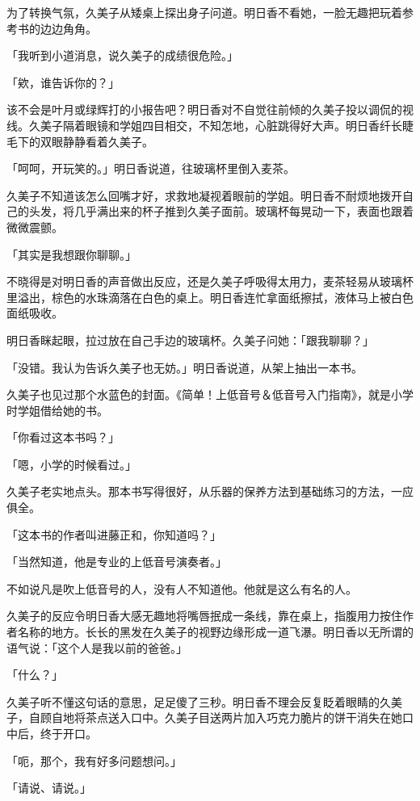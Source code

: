 \documentclass[UTF8]{ctexart}
\begin{document}
    为了转换气氛，久美子从矮桌上探出身子问道。明日香不看她，一脸无趣把玩着参考书的边边角角。 

    「我听到小道消息，说久美子的成绩很危险。」 

    「欸，谁告诉你的？」 

    该不会是叶月或绿辉打的小报告吧？明日香对不自觉往前倾的久美子投以调侃的视线。久美子隔着眼镜和学姐四目相交，不知怎地，心脏跳得好大声。明日香纤长睫毛下的双眼静静看着久美子。 

    「呵呵，开玩笑的。」明日香说道，往玻璃杯里倒入麦茶。 

    久美子不知道该怎么回嘴才好，求救地凝视着眼前的学姐。明日香不耐烦地拨开自己的头发，将几乎满出来的杯子推到久美子面前。玻璃杯每晃动一下，表面也跟着微微震颤。 

    「其实是我想跟你聊聊。」 

    不晓得是对明日香的声音做出反应，还是久美子呼吸得太用力，麦茶轻易从玻璃杯里溢出，棕色的水珠滴落在白色的桌上。明日香连忙拿面纸擦拭，液体马上被白色面纸吸收。 

    明日香眯起眼，拉过放在自己手边的玻璃杯。久美子问她：「跟我聊聊？」 

    「没错。我认为告诉久美子也无妨。」明日香说道，从架上抽出一本书。 

    久美子也见过那个水蓝色的封面。《简单！上低音号＆低音号入门指南》，就是小学时学姐借给她的书。 

    「你看过这本书吗？」 

    「嗯，小学的时候看过。」 

    久美子老实地点头。那本书写得很好，从乐器的保养方法到基础练习的方法，一应俱全。 

    「这本书的作者叫进藤正和，你知道吗？」 

    「当然知道，他是专业的上低音号演奏者。」 

    不如说凡是吹上低音号的人，没有人不知道他。他就是这么有名的人。 

    久美子的反应令明日香大感无趣地将嘴唇抿成一条线，靠在桌上，指腹用力按住作者名称的地方。长长的黑发在久美子的视野边缘形成一道飞瀑。明日香以无所谓的语气说：「这个人是我以前的爸爸。」 

    「什么？」 

    久美子听不懂这句话的意思，足足傻了三秒。明日香不理会反复眨着眼睛的久美子，自顾自地将茶点送入口中。久美子目送两片加入巧克力脆片的饼干消失在她口中后，终于开口。 

    「呃，那个，我有好多问题想问。」 

    「请说、请说。」 
\end{document}
